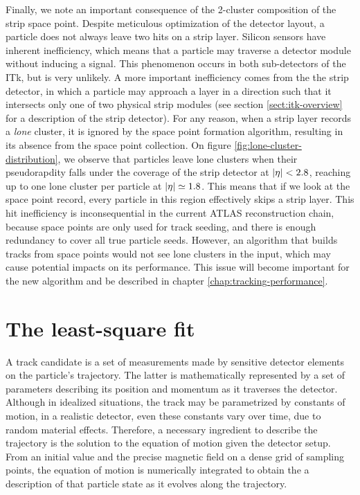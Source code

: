 Finally, we note an important consequence of the 2-cluster composition of the strip space point.
Despite meticulous optimization of the detector layout, a particle does not always leave two hits on a strip layer. 
Silicon sensors have inherent inefficiency, which means that a particle may traverse a detector module without inducing a signal.
This phenomenon occurs in both sub-detectors of the ITk, but is very unlikely.
A more important inefficiency comes from the the strip detector, in which a particle may approach a layer in a direction such that it intersects only one of two physical strip modules (see section \ref{sect:itk-overview} for a description of the strip detector). 
For any reason, when a strip layer records a \textit{lone} cluster, it is ignored by the space point formation algorithm, resulting in its absence from the space point collection.
On figure \ref{fig:lone-cluster-distribution}, we observe that particles leave lone clusters when their pseudorapdity falls under the coverage of the strip detector at $\abs{\eta}<2.8$, 
reaching up to one lone cluster per particle at $\abs{\eta}\simeq 1.8$.
This means that if we look at the space point record, every particle in this region effectively skips a strip layer.
This hit inefficiency is inconsequential in the current ATLAS reconstruction chain, because space points are only used for track seeding, and there is enough redundancy to cover all true particle seeds.
However, an algorithm that builds tracks from space points would not see lone clusters in the input, which may cause potential impacts on its performance.
This issue will become important for the new algorithm and be described in chapter \ref{chap:tracking-performance}.

\section{The least-square fit}
\label{sect:track-fit}

A track candidate is a set of measurements made by sensitive detector elements on the particle's trajectory. 
The latter is mathematically represented by a set of parameters describing its position and momentum as it traverses the detector. 
Although in idealized situations, the track may be parametrized by constants of motion, in a realistic detector, even these constants vary over time, due to random material effects. 
Therefore, a necessary ingredient to describe the trajectory is the solution to the equation of motion given the detector setup. 
From an initial value and the precise magnetic field on a dense grid of sampling points, the equation of motion is numerically integrated to obtain the a description of that particle state as it evolves along the trajectory. 

